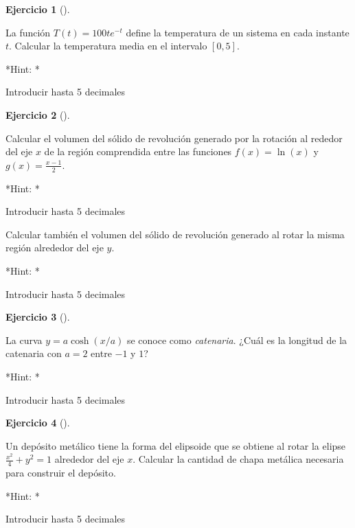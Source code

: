 \documentclass[
  a4paper,
]{scrreport}
\theoremstyle{definition}
\newtheorem{exercise}{Ejercicio}[chapter]
\theoremstyle{remark}
\begin{document}
\begin{exercise}[]\protect\hypertarget{exr-integrales-propuesto-4}{}\label{exr-integrales-propuesto-4}

La función \(T(t)=100te^{-t}\) define la temperatura de un sistema en
cada instante \(t\). Calcular la temperatura media en el intervalo
\([0,5]\).

\vspace{18pt}*Hint: *

Introducir hasta 5 decimales

\end{exercise}

\begin{exercise}[]\protect\hypertarget{exr-integrales-propuesto-5}{}\label{exr-integrales-propuesto-5}

Calcular el volumen del sólido de revolución generado por la rotación al
rededor del eje \(x\) de la región comprendida entre las funciones
\(f(x)=\ln(x)\) y \(g(x)=\frac{x-1}{2}\).

\vspace{18pt}*Hint: *

Introducir hasta 5 decimales

Calcular también el volumen del sólido de revolución generado al rotar
la misma región alrededor del eje \(y\).

\vspace{18pt}*Hint: *

Introducir hasta 5 decimales

\end{exercise}

\begin{exercise}[]\protect\hypertarget{exr-integrales-propuesto-6}{}\label{exr-integrales-propuesto-6}

La curva \(y=a\cosh(x/a)\) se conoce como \emph{catenaria}. ¿Cuál es la
longitud de la catenaria con \(a=2\) entre \(-1\) y \(1\)?

\vspace{18pt}*Hint: *

Introducir hasta 5 decimales

\end{exercise}

\begin{exercise}[]\protect\hypertarget{exr-integrales-propuesto-7}{}\label{exr-integrales-propuesto-7}

Un depósito metálico tiene la forma del elipsoide que se obtiene al
rotar la elipse \(\frac{x^2}{4}+y^2=1\) alrededor del eje \(x\).
Calcular la cantidad de chapa metálica necesaria para construir el
depósito.

\vspace{18pt}*Hint: *

Introducir hasta 5 decimales

\end{exercise}
\end{document}
